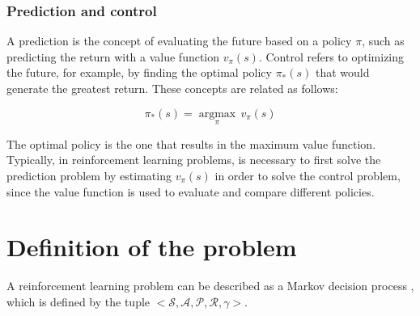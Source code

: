 \subsubsection*{Prediction and control}

A prediction is the concept of evaluating the future based on a policy $\pi$, such as predicting the return with a value function $v_\pi(s)$. Control refers to optimizing the future, for example, by finding the optimal policy $\pi_\ast(s)$ that would generate the greatest return. These concepts are related as follows:

\begin{equation}
    \pi_\ast(s) = \underset{\pi}{\operatorname{argmax}}\,v_\pi(s)
\end{equation}

The optimal policy is the one that results in the maximum value function. Typically, in reinforcement learning problems, is necessary to first solve the prediction problem by estimating $v_\pi(s)$ in order to solve the control problem, since the value function is used to evaluate and compare different policies.

\section{Definition of the problem}

A reinforcement learning problem can be described as a Markov decision process \cite{Sutton:2018}, which is defined by the tuple $<\mathcal{S}, \mathcal{A},\mathcal{P},\mathcal{R},\gamma>$.

